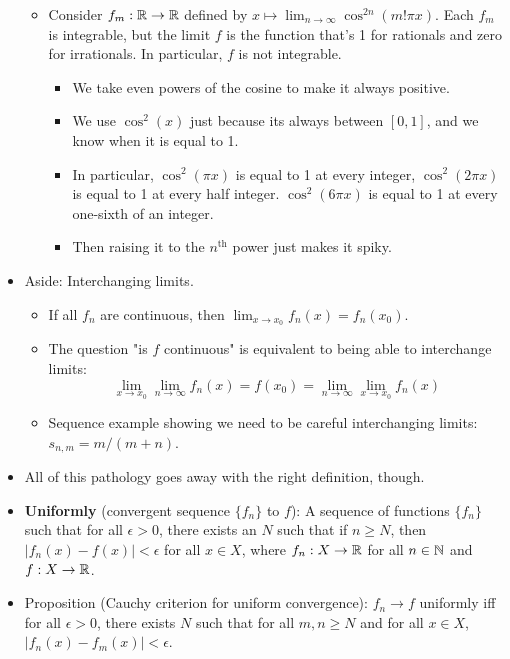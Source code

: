 \documentclass[../notes.tex]{subfiles}
\begin{document}
\begin{itemize}
\begin{itemize}
        \item Consider $f_m:\mathbb{R}\to\mathbb{R}$ defined by $x\mapsto\lim_{n\to\infty}\cos^{2n}(m!\pi x)$. Each $f_m$ is integrable, but the limit $f$ is the function that's 1 for rationals and zero for irrationals. In particular, $f$ is not integrable.
        \begin{itemize}
            \item We take even powers of the cosine to make it always positive.
            \item We use $\cos^2(x)$ just because its always between $[0,1]$, and we know when it is equal to 1.
            \item In particular, $\cos^2(\pi x)$ is equal to 1 at every integer, $\cos^2(2\pi x)$ is equal to 1 at every half integer. $\cos^2(6\pi x)$ is equal to 1 at every one-sixth of an integer.
            \item Then raising it to the $n^\text{th}$ power just makes it spiky.
        \end{itemize}
    \end{itemize}
    \item Aside: Interchanging limits.
    \begin{itemize}
        \item If all $f_n$ are continuous, then $\lim_{x\to x_0}f_n(x)=f_n(x_0)$.
        \item The question "is $f$ continuous" is equivalent to being able to interchange limits:
        \begin{equation*}
            \lim_{x\to x_0}\lim_{n\to\infty}f_n(x) = f(x_0) = \lim_{n\to\infty}\lim_{x\to x_0}f_n(x)
        \end{equation*}
        \item Sequence example showing we need to be careful interchanging limits: $s_{n,m}=m/(m+n)$.
    \end{itemize}
    \item All of this pathology goes away with the right definition, though.
    \item \textbf{Uniformly} (convergent sequence $\{f_n\}$ to $f$): A sequence of functions $\{f_n\}$ such that for all $\epsilon>0$, there exists an $N$ such that if $n\geq N$, then $|f_n(x)-f(x)|<\epsilon$ for all $x\in X$, where $f_n:X\to\mathbb{R}$ for all $n\in\mathbb{N}$ and $f:X\to\mathbb{R}$.
    \item Proposition (Cauchy criterion for uniform convergence): $f_n\to f$ uniformly iff for all $\epsilon>0$, there exists $N$ such that for all $m,n\geq N$ and for all $x\in X$, $|f_n(x)-f_m(x)|<\epsilon$.

\end{itemize}
\end{document}
